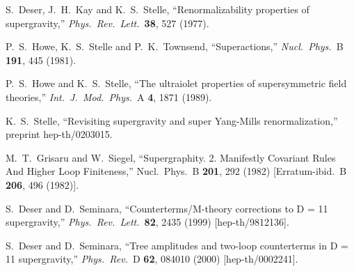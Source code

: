 \documentclass[12pt]{livrev}
\begin{document}
\begin{thebibliography}{99}
S.~Deser, J.~H.~Kay and K.~S.~Stelle,
``Renormalizability properties of supergravity,''
{\it Phys.\ Rev.\ Lett.}\  {\bf 38}, 527 (1977).

P.~S.~Howe, K.~S.~Stelle and P.~K.~Townsend,
``Superactions,''
{\it Nucl.\ Phys.}\ B {\bf 191}, 445 (1981).

P.~S.~Howe and K.~S.~Stelle,
``The ultraiolet properties of supersymmetric field theories,''
{\it Int.\ J.\ Mod.\ Phys.}\ A {\bf 4}, 1871 (1989).

K.~S.~Stelle,
``Revisiting supergravity and super Yang-Mills renormalization,''
preprint hep-th/0203015.

M.~T.~Grisaru and W.~Siegel,
``Supergraphity. 2. Manifestly Covariant Rules And Higher Loop Finiteness,''
Nucl.\ Phys.\ B {\bf 201}, 292 (1982)
[Erratum-ibid.\ B {\bf 206}, 496 (1982)].

S.~Deser and D.~Seminara,
``Counterterms/M-theory corrections to D = 11 supergravity,''
{\it Phys.\ Rev.\ Lett.}\  {\bf 82}, 2435 (1999)
[hep-th/9812136].

S.~Deser and D.~Seminara,
``Tree amplitudes and two-loop counterterms in D = 11 supergravity,''
{\it Phys.\ Rev.}\ D {\bf 62}, 084010 (2000)
[hep-th/0002241].


\end{thebibliography}
\end{document}
